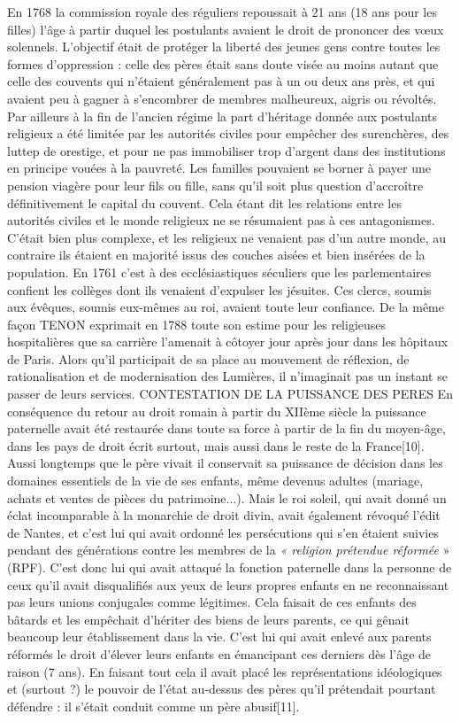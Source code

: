 En 1768 la commission royale des réguliers repoussait à 21 ans (18 ans pour les filles) l'âge à partir duquel les postulants avaient le droit de prononcer des vœux solennels. L'objectif était de protéger la liberté des jeunes gens contre toutes les formes d'oppression : celle des pères était sans doute visée au moins autant que celle des couvents qui n'étaient généralement pas à un ou deux ans près, et qui avaient peu à gagner à s'encombrer de membres malheureux, aigris ou révoltés.
 Par ailleurs à la fin de l'ancien régime la part d'héritage donnée aux postulants religieux a été limitée par les autorités civiles pour empêcher des surenchères, des luttep de orestige, et pour ne pas immobiliser trop d'argent dans des institutions en principe vouées à la pauvreté. Les familles pouvaient se borner à payer une pension viagère pour leur fils ou fille, sans qu'il soit plus question d'accroître définitivement le capital du couvent.
 Cela étant dit les relations entre les autorités civiles et le monde religieux ne se résumaient pas à ces antagonismes. C'était bien plus complexe, et les religieux ne venaient pas d'un autre monde, au contraire ils étaient en majorité issus des couches aisées et bien insérées de la population. En 1761 c'est à des ecclésiastiques séculiers que les parlementaires confient les collèges dont ils venaient d'expulser les jésuites. Ces clercs, soumis aux évêques, soumis eux-mêmes au roi, avaient toute leur confiance. De la même façon TENON exprimait en 1788 toute son estime pour les religieuses hospitalières que sa carrière l'amenait à côtoyer jour après jour dans les hôpitaux de Paris. Alors qu'il participait de sa place au mouvement de réflexion, de rationalisation et de modernisation des Lumières, il n'imaginait pas un instant se passer de leurs services. 
CONTESTATION DE LA PUISSANCE DES PERES
 En conséquence du retour au droit romain à partir du XIIème siècle la puissance paternelle avait été restaurée dans toute sa force à partir de la fin du moyen-âge, dans les pays de droit écrit surtout, mais aussi dans le reste de la France[10]. Aussi longtemps que le père vivait il conservait sa puissance de décision dans les domaines essentiels de la vie de ses enfants, même devenus adultes (mariage, achats et ventes de pièces du patrimoine...). 
 Mais le roi soleil, qui avait donné un éclat incomparable à la monarchie de droit divin, avait également révoqué l'édit de Nantes, et c'est lui qui avait ordonné les persécutions qui s'en étaient suivies pendant des générations contre les membres de la \emph{« religion prétendue réformée} » (RPF). C'est donc lui qui avait attaqué la fonction paternelle dans la personne de ceux qu'il avait disqualifiés aux yeux de leurs propres enfants en ne reconnaissant pas leurs unions conjugales comme légitimes. Cela faisait de ces enfants des bâtards et les empêchait d'hériter des biens de leurs parents, ce qui gênait beaucoup leur établissement dans la vie. C'est lui qui avait enlevé aux parents réformés le droit d'élever leurs enfants en émancipant ces derniers dès l'âge de raison (7 ans). En faisant tout cela il avait placé les représentations idéologiques et (surtout ?) le pouvoir de l'état au-dessus des pères qu'il prétendait pourtant défendre : il s'était conduit comme un père abusif[11].
